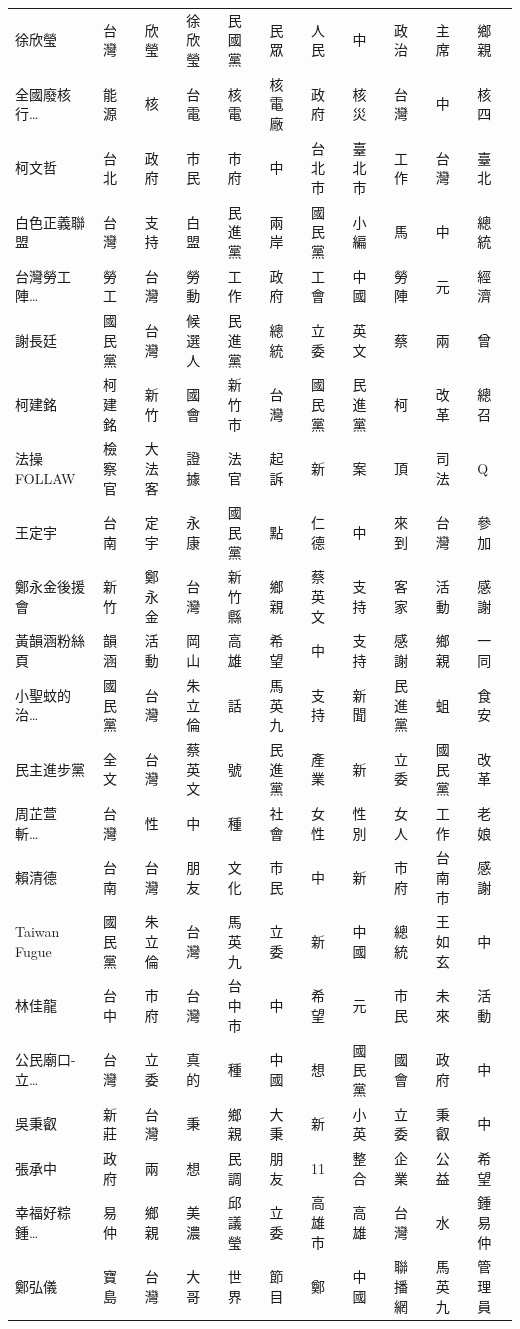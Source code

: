 \documentclass[a4paper, 10pt, conference]{ieeeconf}       %
\begin{document}
\begin{CJK}{UTF8}{bsmi}
\begin{longtable}[c]{@{}L{2.45cm}L{1.1cm}L{1.1cm}L{1.1cm}L{1.1cm}L{1.1cm}L{1.1cm}L{1.1cm}L{1.41cm}L{1.1cm}L{1.1cm}@{}}
徐欣瑩 & 台灣 & 欣瑩 & 徐欣瑩 & 民國黨 & 民眾 & 人民 & 中 & 政治 & 主席 & 鄉親 \\
全國廢核行\dots & 能源 & 核 & 台電 & 核電 & 核電廠 & 政府 & 核災 & 台灣 & 中 & 核四 \\
柯文哲 & 台北 & 政府 & 市民 & 市府 & 中 & 台北市 & 臺北市 & 工作 & 台灣 & 臺北 \\
白色正義聯盟 & 台灣 & 支持 & 白盟 & 民進黨 & 兩岸 & 國民黨 & 小編 & 馬 & 中 & 總統 \\
台灣勞工陣\dots & 勞工 & 台灣 & 勞動 & 工作 & 政府 & 工會 & 中國 & 勞陣 & 元 & 經濟 \\
謝長廷 & 國民黨 & 台灣 & 候選人 & 民進黨 & 總統 & 立委 & 英文 & 蔡 & 兩 & 曾 \\
柯建銘 & 柯建銘 & 新竹 & 國會 & 新竹市 & 台灣 & 國民黨 & 民進黨 & 柯 & 改革 & 總召 \\
法操FOLLAW & 檢察官 & 大法客 & 證據 & 法官 & 起訴 & 新 & 案 & 頂 & 司法 & Q \\
王定宇 & 台南 & 定宇 & 永康 & 國民黨 & 點 & 仁德 & 中 & 來到 & 台灣 & 參加 \\
鄭永金後援會 & 新竹 & 鄭永金 & 台灣 & 新竹縣 & 鄉親 & 蔡英文 & 支持 & 客家 & 活動 & 感謝 \\
黃韻涵粉絲頁 & 韻涵 & 活動 & 岡山 & 高雄 & 希望 & 中 & 支持 & 感謝 & 鄉親 & 一同 \\
小聖蚊的治\dots & 國民黨 & 台灣 & 朱立倫 & 話 & 馬英九 & 支持 & 新聞 & 民進黨 & 蛆 & 食安 \\
民主進步黨 & 全文 & 台灣 & 蔡英文 & 號 & 民進黨 & 產業 & 新 & 立委 & 國民黨 & 改革 \\
周芷萱　斬\dots & 台灣 & 性 & 中 & 種 & 社會 & 女性 & 性別 & 女人 & 工作 & 老娘 \\
賴清德 & 台南 & 台灣 & 朋友 & 文化 & 市民 & 中 & 新 & 市府 & 台南市 & 感謝 \\
Taiwan Fugue & 國民黨 & 朱立倫 & 台灣 & 馬英九 & 立委 & 新 & 中國 & 總統 & 王如玄 & 中 \\
林佳龍 & 台中 & 市府 & 台灣 & 台中市 & 中 & 希望 & 元 & 市民 & 未來 & 活動 \\
公民廟口-立\dots & 台灣 & 立委 & 真的 & 種 & 中國 & 想 & 國民黨 & 國會 & 政府 & 中 \\
吳秉叡 & 新莊 & 台灣 & 秉 & 鄉親 & 大秉 & 新 & 小英 & 立委 & 秉叡 & 中 \\
張承中 & 政府 & 兩 & 想 & 民調 & 朋友 & 11 & 整合 & 企業 & 公益 & 希望 \\
幸福好粽 鍾\dots & 易仲 & 鄉親 & 美濃 & 邱議瑩 & 立委 & 高雄市 & 高雄 & 台灣 & 水 & 鍾易仲 \\
鄭弘儀 & 寶島 & 台灣 & 大哥 & 世界 & 節目 & 鄭 & 中國 & 聯播網 & 馬英九 & 管理員 \\

\end{longtable}
\end{CJK}
\end{document}
